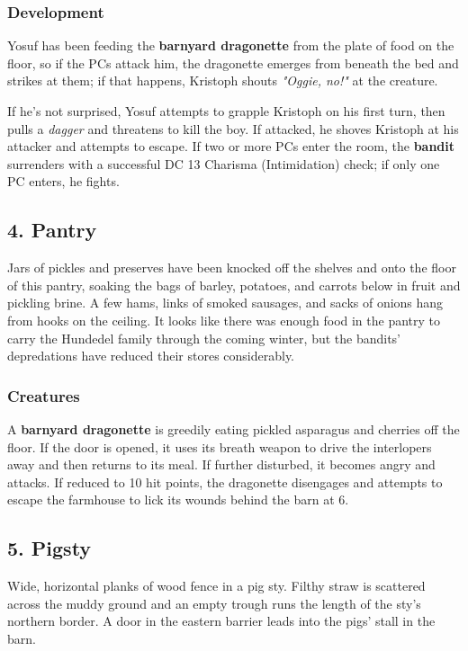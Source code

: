 \documentclass[10pt,a4paper,twoside,bg=print,twocolumn,openany,nodeprecatedcode]{dndbook}
\begin{document}
\subsubsection{Development}
Yosuf has been feeding the \textbf{barnyard dragonette} from the plate of food on the floor, so if the PCs attack him, the dragonette emerges from beneath the bed and strikes at them; if that happens, Kristoph shouts \textit{"Oggie, no!"} at the creature.

If he's not surprised, Yosuf attempts to grapple Kristoph on his first turn, then pulls a \textit{dagger} and threatens to kill the boy. If attacked, he shoves Kristoph at his attacker and attempts to escape. If two or more PCs enter the room, the \textbf{bandit} surrenders with a successful DC 13 Charisma (Intimidation) check; if only one PC enters, he fights.

\subsection{4. Pantry}
\begin{DndReadAloud}{}
Jars of pickles and preserves have been knocked off the shelves and onto the floor of this pantry, soaking the bags of barley, potatoes, and carrots below in fruit and pickling brine. A few hams, links of smoked sausages, and sacks of onions hang from hooks on the ceiling. It looks like there was enough food in the pantry to carry the Hundedel family through the coming winter, but the bandits' depredations have reduced their stores considerably.

\end{DndReadAloud}

\subsubsection{Creatures}
A \textbf{barnyard dragonette} is greedily eating pickled asparagus and cherries off the floor. If the door is opened, it uses its breath weapon to drive the interlopers away and then returns to its meal. If further disturbed, it becomes angry and attacks. If reduced to 10 hit points, the dragonette disengages and attempts to escape the farmhouse to lick its wounds behind the barn at 6.

\subsection{5. Pigsty}
\begin{DndReadAloud}{}
Wide, horizontal planks of wood fence in a pig sty. Filthy straw is scattered across the muddy ground and an empty trough runs the length of the sty's northern border. A door in the eastern barrier leads into the pigs' stall in the barn.

\end{DndReadAloud}
\end{document}
